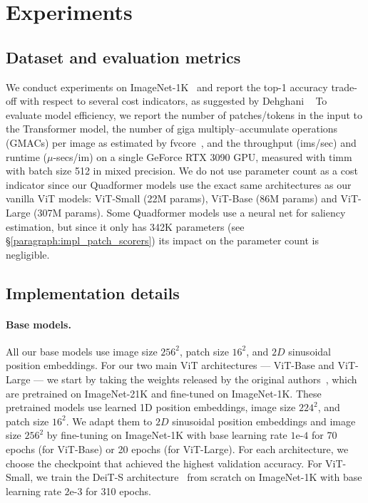 \section{Experiments}

\subsection{Dataset and evaluation metrics}
We conduct experiments on ImageNet-1K~\cite{Russakovsky2014ImageNetLS} and report the top-1 accuracy trade-off with respect to several cost indicators, as suggested by Dehghani \etal~\cite{Dehghani2021TheEM} To evaluate model efficiency, we report the number of patches/tokens in the input to the Transformer model, the number of giga multiply--accumulate operations (GMACs) per image as estimated by fvcore~\cite{fvcore_flop_counting}, and the throughput (ims/sec) and runtime ($\mu$-secs/im) on a single GeForce RTX 3090 GPU, measured with timm~\cite{rw2019timm} with batch size 512 in mixed precision. We do not use parameter count as a cost indicator since our Quadformer models use the exact same architectures as our vanilla ViT models: ViT-Small (22M params), ViT-Base (86M params) and ViT-Large (307M params). Some Quadformer models use a neural net for saliency estimation, but since it only has 342K parameters (see \S\ref{paragraph:impl_patch_scorers}) its impact on the parameter count is negligible.

\subsection{Implementation details}

\paragraph{Base models.}
All our base models use image size $256^2$, patch size $16^2$, and $2D$ sinusoidal position embeddings. For our two main ViT architectures --- ViT-Base and ViT-Large --- we start by taking the weights released by the original authors~\cite{Dosovitskiy2020AnII}, which are pretrained on ImageNet-21K and fine-tuned on ImageNet-1K. These pretrained models use learned 1D position embeddings, image size $224^2$, and patch size $16^2$. We adapt them to $2D$ sinusoidal position embeddings and image size $256^2$ by fine-tuning on ImageNet-1K with base learning rate $1\text{e-}4$ for 70 epochs (for ViT-Base) or 20 epochs (for ViT-Large). For each architecture, we choose the checkpoint that achieved the highest validation accuracy. For ViT-Small, we train the DeiT-S architecture~\cite{Touvron2020TrainingDI} from scratch on ImageNet-1K with base learning rate $2\text{e-}3$ for 310 epochs.

